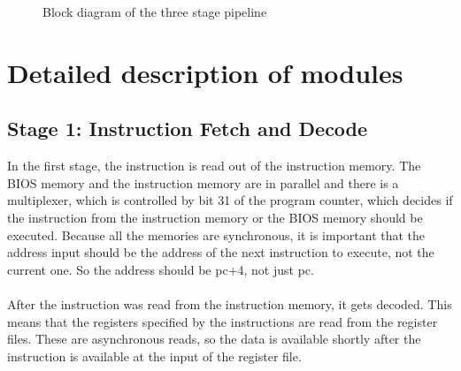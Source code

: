 \documentclass[12pt]{article}
\begin{document}
\begin{figure}[!hbtp]
\caption{Block diagram of the three stage pipeline}
\label{fig:block-diagram}
\end{figure}


\section{Detailed description of modules}
\subsection*{Stage 1: Instruction Fetch and Decode}
In the first stage, the instruction is read out of the instruction memory. The BIOS memory and the instruction memory are in parallel and there is a multiplexer, which is controlled by bit 31 of the program counter, which decides if the instruction from the instruction memory or the BIOS memory should be executed. Because all the memories are synchronous, it is important that the address input should be the address of the next instruction to execute, not the current one. So the address should be pc+4, not just pc. \\\\
After the instruction was read from the instruction memory, it gets decoded. This means that the registers specified by the instructions are read from the register files. These are asynchronous reads, so the data is available shortly after the instruction is available at the input of the register file.
\end{document}
